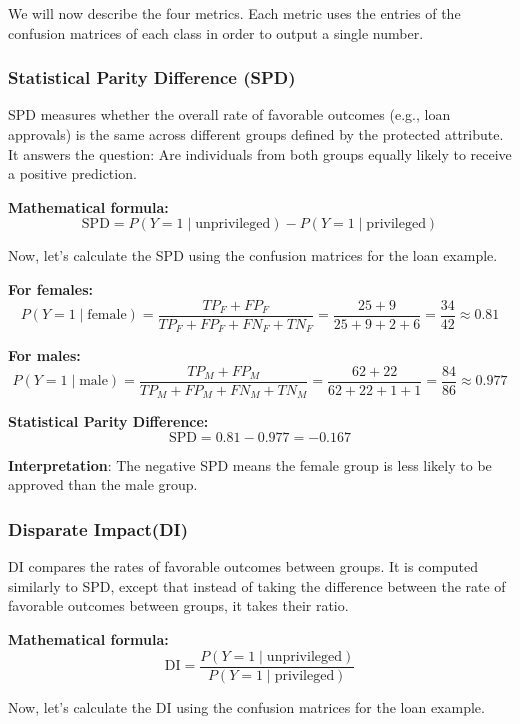 \par We will now describe the four metrics. Each metric uses the entries of the confusion matrices of each class in order to output a single number.

\subsubsection{Statistical Parity Diﬀerence (SPD)}
SPD measures whether the overall rate of favorable outcomes (e.g., loan approvals) is the same across different groups defined by the protected attribute. It answers the question: Are individuals from both groups equally likely to receive a positive prediction.
\par \textbf{Mathematical formula:}
$$
\text{SPD} = P(Y = 1 \mid \text{unprivileged}) - P(Y = 1 \mid \text{privileged})
$$

\par Now, let's calculate the SPD using the confusion matrices for the loan example.
\par \textbf{For females:}
$$
P(Y = 1 \mid \text{female}) = \frac{TP_F + FP_F}{TP_F + FP_F + FN_F + TN_F} = \frac{25 + 9}{25 + 9 + 2 + 6} = \frac{34}{42} \approx 0.81
$$

\textbf{For males:}
$$
P(Y = 1 \mid \text{male}) = \frac{TP_M + FP_M}{TP_M + FP_M + FN_M + TN_M} = \frac{62 + 22}{62 + 22 + 1 + 1} = \frac{84}{86} \approx 0.977
$$

\textbf{Statistical Parity Difference:}
$$
\text{SPD} = 0.81 - 0.977 = -0.167
$$
\par \textbf{Interpretation}: The negative SPD means the female group is less likely to be approved than the male group. 



\subsubsection{Disparate Impact(DI)}
DI compares the rates of favorable outcomes between groups. It is computed similarly to SPD, except that instead of taking the difference between the rate of favorable outcomes between groups, it takes their ratio.

\par \textbf{Mathematical formula:}
$$
\text{DI} = \frac{P(Y = 1 \mid \text{unprivileged})}{P(Y = 1 \mid \text{privileged})}
$$

\par Now, let's calculate the DI using the confusion matrices for the loan example.

